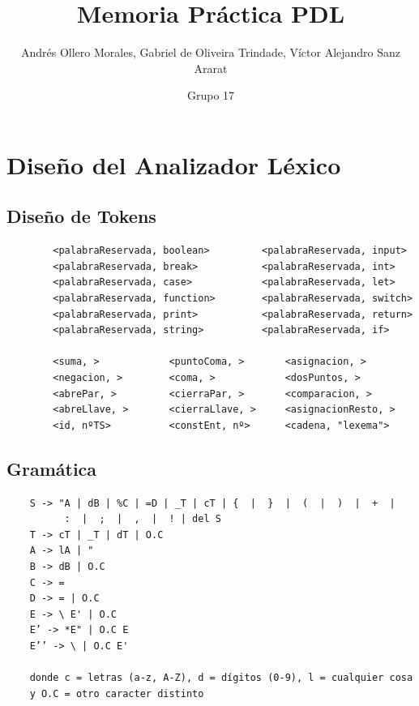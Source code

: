 \documentclass{article}[a4paper]
\title{Memoria Práctica PDL}
\author{Andrés Ollero Morales, Gabriel de Oliveira Trindade, Víctor Alejandro Sanz Ararat}
\date{Grupo 17}
\begin{document}
\maketitle
\thispagestyle{empty}
\newpage
\tableofcontents
\thispagestyle{empty}

\newpage

\section{Diseño del Analizador Léxico}

\subsection{Diseño de Tokens}
\begin{verbatim}
        <palabraReservada, boolean>         <palabraReservada, input>
        <palabraReservada, break>           <palabraReservada, int>
        <palabraReservada, case>            <palabraReservada, let>
        <palabraReservada, function>        <palabraReservada, switch>
        <palabraReservada, print>           <palabraReservada, return>
        <palabraReservada, string>          <palabraReservada, if>
        
        <suma, >            <puntoComa, >       <asignacion, >
        <negacion, >        <coma, >            <dosPuntos, >
        <abrePar, >         <cierraPar, >       <comparacion, >
        <abreLlave, >       <cierraLlave, >     <asignacionResto, >
        <id, nºTS>          <constEnt, nº>      <cadena, "lexema">
\end{verbatim}

\subsection{Gramática}
\begin{verbatim}
    S -> "A | dB | %C | =D | _T | cT | {  |  }  |  (  |  )  |  +  |
          :  |  ;  |  ,  |  ! | del S
    T -> cT | _T | dT | O.C 
    A -> lA | " 
    B -> dB | O.C
    C -> =
    D -> = | O.C
    E -> \ E' | O.C
    E’ -> *E" | O.C E
    E’’ -> \ | O.C E'
    
    donde c = letras (a-z, A-Z), d = dígitos (0-9), l = cualquier cosa 
    y O.C = otro caracter distinto
\end{verbatim} 

\end{document}
